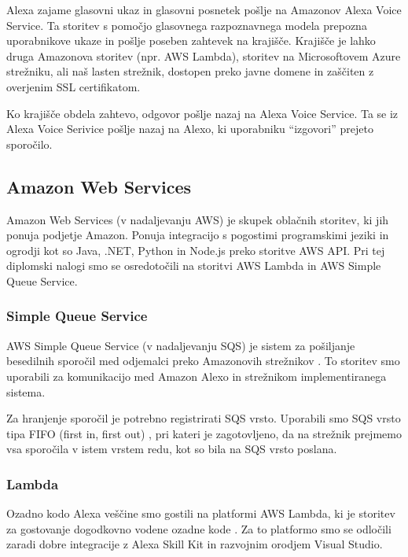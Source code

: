 \documentclass[a4paper, 12pt]{book}
\begin{document}
Alexa zajame glasovni ukaz in glasovni posnetek pošlje na Amazonov Alexa Voice Service.
Ta storitev s pomočjo glasovnega razpoznavnega modela prepozna uporabnikove ukaze in pošlje poseben zahtevek na krajišče.
Krajišče je lahko druga Amazonova storitev (npr. AWS Lambda), storitev na Microsoftovem Azure strežniku, ali naš lasten strežnik, dostopen preko javne domene in zaščiten z overjenim SSL certifikatom.

Ko krajišče obdela zahtevo, odgovor pošlje nazaj na Alexa Voice Service.
Ta se iz Alexa Voice Serivice pošlje nazaj na Alexo, ki uporabniku \enquote{izgovori} prejeto sporočilo.



\subsection{Amazon Web Services}

Amazon Web Services (v nadaljevanju AWS) je skupek oblačnih storitev, ki jih ponuja podjetje Amazon.
Ponuja integracijo s pogostimi programskimi jeziki in ogrodji kot so Java, .NET, Python in Node.js preko storitve AWS API.
Pri tej diplomski nalogi smo se osredotočili na storitvi AWS Lambda in AWS Simple Queue Service.



\subsubsection{Simple Queue Service}

AWS Simple Queue Service (v nadaljevanju SQS) je sistem za pošiljanje besedilnih sporočil med odjemalci preko Amazonovih strežnikov \cite{sqs}.
To storitev smo uporabili za komunikacijo med Amazon Alexo in strežnikom implementiranega sistema.

Za hranjenje sporočil je potrebno registrirati SQS vrsto. 
Uporabili smo SQS vrsto tipa FIFO (first in, first out) \cite{sqsfifo}, pri kateri je zagotovljeno, da na strežnik prejmemo vsa sporočila v istem vrstem redu, kot so bila na SQS vrsto poslana.




\subsubsection{Lambda}

Ozadno kodo Alexa veščine smo gostili na platformi AWS Lambda, ki je storitev za gostovanje dogodkovno vodene ozadne kode \cite{lambda}.
Za to platformo smo se odločili zaradi dobre integracije z Alexa Skill Kit in razvojnim orodjem Visual Studio.
\end{document}
